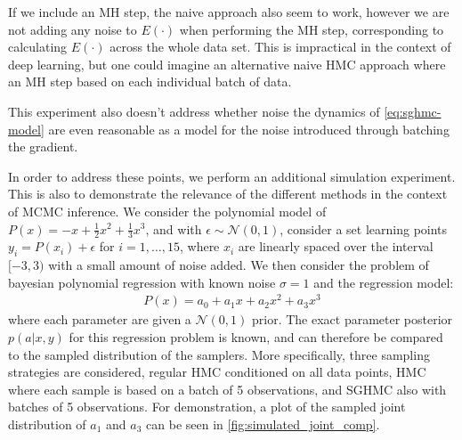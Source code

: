 If we include an MH step, the naive approach also seem to work, however we are not adding any noise to $E(\cdot)$ when performing the MH step, corresponding to calculating $E(\cdot)$ across the whole data set. 
This is impractical in the context of deep learning, but one could imagine an alternative naive HMC approach where an MH step based on each individual batch of data. 

This experiment also doesn't address whether noise the dynamics of \cref{eq:sghmc-model} are even reasonable as a model for the noise introduced through batching the gradient. 

In order to address these points, we perform an additional simulation experiment. 
This is also to demonstrate the relevance of the different methods in the context of MCMC inference.
We consider the polynomial model of $P(x) = -x + \frac{1}{2}x^2 + \frac{1}{3}x^3$, 
and with $\epsilon \sim \mathcal{N}(0, 1)$, consider a set learning points $y_i = P(x_i) + \epsilon$ for $i=1,\dots,15$, where $x_i$ are linearly spaced over the interval $[-3, 3)$ with a small amount of noise added. 
We then consider the problem of bayesian polynomial regression with known noise $\sigma=1$ and the regression model:
\begin{align*}
    P(x) = a_0 + a_1 x+a_2 x^2 + a_3 x^3
\end{align*}
where each parameter are given a $\mathcal{N}(0, 1)$ prior.
The exact parameter posterior $p(a|x,y)$ for this regression problem is known, and can therefore be compared to the sampled distribution of the samplers. 
More specifically, three sampling strategies are considered, regular HMC conditioned on all data points, HMC where each sample is based on a batch of 5 observations, and SGHMC also with batches of 5 observations.
For demonstration, a plot of the sampled joint distribution of $a_1$ and $a_3$ can be seen in \cref{fig:simulated_joint_comp}.

